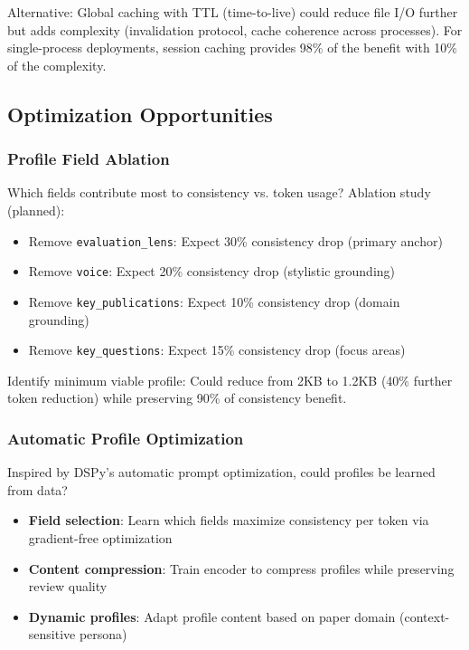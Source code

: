 Alternative: Global caching with TTL (time-to-live) could reduce file I/O further but adds complexity (invalidation protocol, cache coherence across processes). For single-process deployments, session caching provides 98\% of the benefit with 10\% of the complexity.

\subsection{Optimization Opportunities}

\label{sec:future-work}

\subsubsection{Profile Field Ablation}

Which fields contribute most to consistency vs. token usage? Ablation study (planned):

\begin{itemize}
\item Remove \texttt{evaluation\_lens}: Expect 30\% consistency drop (primary anchor)
\item Remove \texttt{voice}: Expect 20\% consistency drop (stylistic grounding)
\item Remove \texttt{key\_publications}: Expect 10\% consistency drop (domain grounding)
\item Remove \texttt{key\_questions}: Expect 15\% consistency drop (focus areas)
\end{itemize}

Identify minimum viable profile: Could reduce from 2KB to 1.2KB (40\% further token reduction) while preserving 90\% of consistency benefit.

\subsubsection{Automatic Profile Optimization}

Inspired by DSPy's automatic prompt optimization, could profiles be learned from data?

\begin{itemize}
\item \textbf{Field selection}: Learn which fields maximize consistency per token via gradient-free optimization
\item \textbf{Content compression}: Train encoder to compress profiles while preserving review quality
\item \textbf{Dynamic profiles}: Adapt profile content based on paper domain (context-sensitive persona)
\end{itemize}

